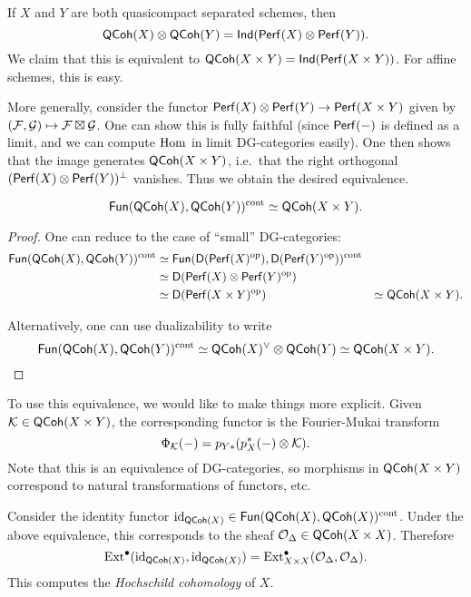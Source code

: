 \documentclass{amsart}
\begin{document}
If $X$ and $Y$ are both quasicompact separated schemes, then
\[
	\mathsf{QCoh}(X) \otimes \mathsf{QCoh}(Y) = \mathsf{Ind}(\mathsf{Perf}(X) \otimes \mathsf{Perf}(Y)).
\]
We claim that this is equivalent to $\mathsf{QCoh}(X \times Y) = \mathsf{Ind}(\mathsf{Perf}(X \times Y))$.
For affine schemes, this is easy.

More generally, consider the functor $\mathsf{Perf}(X) \otimes \mathsf{Perf}(Y) \to \mathsf{Perf}(X \times Y)$ given by $(\mathcal{F}, \mathcal{G}) \mapsto \mathcal{F} \boxtimes \mathcal{G}$.
One can show this is fully faithful (since $\mathsf{Perf}(-)$ is defined as a limit, and we can compute $\operatorname{Hom}$ in limit DG-categories easily).
One then shows that the image generates $\mathsf{QCoh}(X \times Y)$, i.e.\ that the right orthogonal $(\mathsf{Perf}(X) \otimes \mathsf{Perf}(Y))^\perp$ vanishes.
Thus we obtain the desired equivalence.

\begin{cor}
	\[
		\mathsf{Fun}(\mathsf{QCoh}(X), \mathsf{QCoh}(Y))^{\mathrm{cont}} \simeq \mathsf{QCoh}(X \times Y).
	\]
\end{cor}

\begin{proof}
	One can reduce to the case of ``small'' DG-categories:
	\begin{align*}
		\mathsf{Fun}(\mathsf{QCoh}(X), \mathsf{QCoh}(Y))^{\mathrm{cont}} &\simeq \mathsf{Fun}(\mathsf{D}(\mathsf{Perf}(X)^{\mathrm{op}}), \mathsf{D}(\mathsf{Perf}(Y)^{\mathrm{op}}))^{\mathrm{cont}} \\
		&\simeq \mathsf{D}(\mathsf{Perf}(X) \otimes \mathsf{Perf}(Y)^{\mathrm{op}}) \\
		&\simeq \mathsf{D}(\mathsf{Perf}(X \times Y)^{\mathrm{op}})
		&\simeq \mathsf{QCoh}(X \times Y).
	\end{align*}

	Alternatively, one can use dualizability to write 
	\[
		\mathsf{Fun}(\mathsf{QCoh}(X), \mathsf{QCoh}(Y))^{\mathrm{cont}} \simeq \mathsf{QCoh}(X)^\vee \otimes \mathsf{QCoh}(Y) \simeq \mathsf{QCoh}(X \times Y).
	\]
\end{proof}

To use this equivalence, we would like to make things more explicit.
Given $\mathcal{K} \in \mathsf{QCoh}(X \times Y)$, the corresponding functor is the Fourier-Mukai transform
\[
	\Phi_{\mathcal{K}}(-) = p_{Y*} (p_X^*(-) \otimes \mathcal{K}).
\]
Note that this is an equivalence of DG-categories, so morphisms in $\mathsf{QCoh}(X \times Y)$ correspond to natural transformations of functors, etc.

\begin{ex}
	Consider the identity functor $\operatorname{id}_{\mathsf{QCoh}(X)} \in \mathsf{Fun}(\mathsf{QCoh}(X), \mathsf{QCoh}(X))^{\mathrm{cont}}$.
	Under the above equivalence, this corresponds to the sheaf $\mathcal{O}_\Delta \in \mathsf{QCoh}(X \times X)$.
	Therefore
	\[
		\operatorname{Ext}^\bullet(\operatorname{id}_{\mathsf{QCoh}(X)}, \operatorname{id}_{\mathsf{QCoh}(X)}) = \operatorname{Ext}^\bullet_{X \times X}(\mathcal{O}_\Delta, \mathcal{O}_\Delta).
	\]
	This computes the \emph{Hochschild cohomology} of $X$.
\end{ex}
\end{document}
